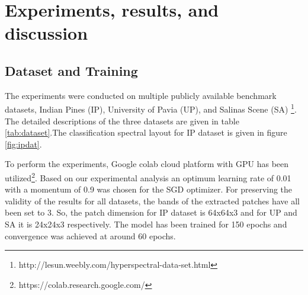 \documentclass[journal]{IEEEtran}
\begin{document}
%         


\section{Experiments, results, and discussion}

\begin{figure*}[]
\centering
{}\quad
{}\quad
{}\quad
{}\quad
\caption{Image cube, spectral ground truth, and spectral prediction for Indian Pines Dataset along with legend.}
\label{fig:ipdat}
\end{figure*} 




\subsection{Dataset and Training}
The experiments were conducted on multiple publicly available benchmark datasets, Indian Pines (IP), University of Pavia (UP), and Salinas Scene (SA) \footnote{http://lesun.weebly.com/hyperspectral-data-set.html}. The detailed descriptions of the three datasets are given in table \ref{tab:dataset}.The classification spectral layout for IP dataset is given in figure \ref{fig:ipdat}.

To perform the experiments, Google colab cloud platform with GPU has been utilized\footnote{https://colab.research.google.com/}. Based on our experimental analysis an optimum learning rate of 0.01 with a momentum of 0.9 was chosen for the SGD optimizer. For preserving the validity of the results for all datasets, the bands of the extracted patches have all been set to 3. So, the patch dimension for IP dataset is 64x64x3 and for UP and SA it is 24x24x3 respectively. The model has been trained for 150 epochs and convergence was achieved at around 60 epochs.
\end{document}

